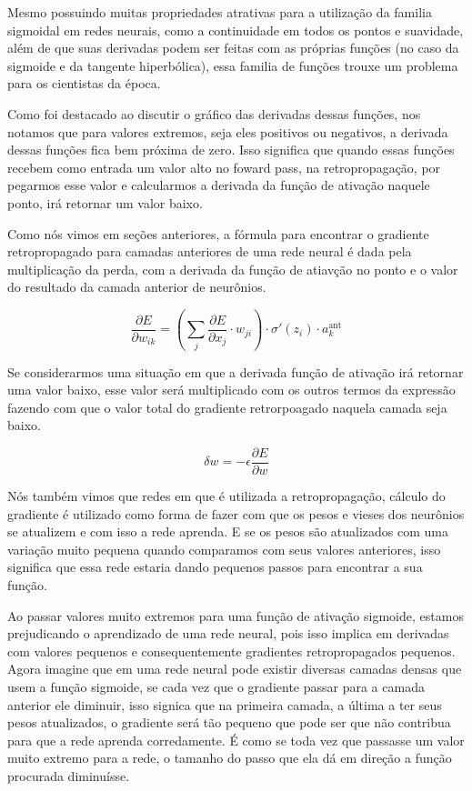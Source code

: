 Mesmo possuindo muitas propriedades atrativas para a utilização da familia sigmoidal em redes neurais, como a continuidade em todos os pontos e suavidade, além de que suas derivadas podem ser feitas com as próprias funções (no caso da sigmoide e da tangente hiperbólica), essa familia de funções trouxe um problema para os cientistas da época.

Como foi destacado ao discutir o gráfico das derivadas dessas funções, nos notamos que para valores extremos, seja eles positivos ou negativos, a derivada dessas funções fica bem próxima de zero. Isso significa que quando essas funções recebem como entrada um valor alto no foward pass, na retropropagação, por pegarmos esse valor e calcularmos a derivada da função de ativação naquele ponto, irá retornar um valor baixo.

Como nós vimos em seções anteriores, a fórmula para encontrar o gradiente retropropagado para camadas anteriores de uma rede neural é dada pela multiplicação da perda, com a derivada da função de atiavção no ponto e o valor do resultado da camada anterior de neurônios. 

\[
    \frac{\partial E}{\partial w_{ik}} = \left( \sum_j \frac{\partial E}{\partial x_j} \cdot w_{ji} \right) \cdot \sigma'(z_i) \cdot a_k^{\text{ant}}
\]

Se considerarmos uma situação em que a derivada função de ativação irá retornar uma valor baixo, esse valor será multiplicado com os outros termos da expressão fazendo com que o valor total do gradiente retrorpoagado naquela camada seja baixo. 

\[
    \delta w = - \epsilon \frac{\partial E}{\partial w}
\]

Nós também vimos que redes em que é utilizada a retropropagação, cálculo do gradiente é utilizado como forma de fazer com que os pesos e vieses dos neurônios se atualizem e com isso a rede aprenda. E se os pesos são atualizados com uma variação muito pequena quando comparamos com seus valores anteriores, isso significa que essa rede estaria dando pequenos passos para encontrar a sua função. 

Ao passar valores muito extremos para uma função de ativação sigmoide, estamos prejudicando o aprendizado de uma rede neural, pois isso implica em derivadas com valores pequenos e consequentemente gradientes retropropagados pequenos. Agora imagine que em uma rede neural pode existir diversas camadas densas que usem a função sigmoide, se cada vez que o gradiente passar para a camada anterior ele diminuir, isso signica que na primeira camada, a última a ter seus pesos atualizados, o gradiente será tão pequeno que pode ser que não contribua para que a rede aprenda corredamente. É como se toda vez que passasse um valor muito extremo para a rede, o tamanho do passo que ela dá em direção a função procurada diminuísse.

